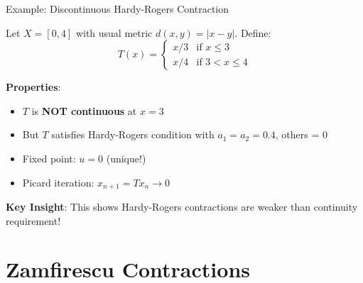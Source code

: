 \documentclass[aspectratio=169,10pt]{beamer}
\begin{document}
\begin{frame}{Example: Discontinuous Hardy-Rogers Contraction}
    \begin{example}
        Let $X = [0, 4]$ with usual metric $d(x,y) = |x - y|$. Define:
        \begin{equation*}
            T(x) = \begin{cases}
                x/3 & \text{if } x \leq 3 \\
                x/4 & \text{if } 3 < x \leq 4
            \end{cases}
        \end{equation*}

        \textbf{Properties}:
        \begin{itemize}
            \item $T$ is \textbf{NOT continuous} at $x = 3$
            \item But $T$ satisfies Hardy-Rogers condition with $a_1 = a_2 = 0.4$, others = 0
            \item Fixed point: $u = 0$ (unique!)
            \item Picard iteration: $x_{n+1} = Tx_n \to 0$
        \end{itemize}
    \end{example}

    \vspace{0.3cm}
    \textbf{Key Insight}: This shows Hardy-Rogers contractions are weaker than
    continuity requirement!
\end{frame}

\section{Zamfirescu Contractions}
\end{document}
